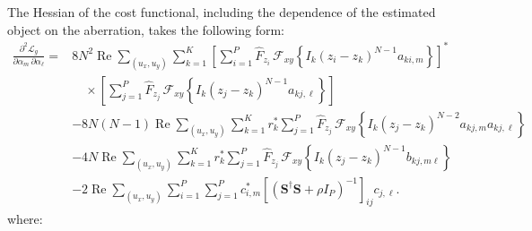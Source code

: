 \documentclass{article}
\begin{document}
The Hessian of the cost functional, including the dependence of the estimated object on the aberration, takes the following form:
\begin{equation}
\begin{aligned}
\frac{\partial^2 \mathcal{L}_g}
{\partial\alpha_m\,\partial\alpha_\ell}
={}&
8N^2\operatorname{Re}
\sum_{(u_x,u_y)}\sum_{k=1}^{K}
\left[
\sum_{i=1}^{P}\widehat F_{z_i}\,
\mathcal F_{xy}
\left\{
I_k(z_i-z_k)^{N-1}a_{ki,m}
\right\}
\right]^*
\\
&\quad\times
\left[
\sum_{j=1}^{P}\widehat F_{z_j}\,
\mathcal F_{xy}
\left\{
I_k(z_j-z_k)^{N-1}a_{kj,\ell}
\right\}
\right]
\\[4pt]
&-
8N(N-1)\operatorname{Re}
\sum_{(u_x,u_y)}\sum_{k=1}^{K}
r_k^*
\sum_{j=1}^{P}\widehat F_{z_j}\,
\mathcal F_{xy}
\left\{
I_k(z_j-z_k)^{N-2}a_{kj,m}a_{kj,\ell}
\right\}
\\[4pt]
&-
4N\operatorname{Re}
\sum_{(u_x,u_y)}\sum_{k=1}^{K}
r_k^*
\sum_{j=1}^{P}\widehat F_{z_j}\,
\mathcal F_{xy}
\left\{
I_k(z_j-z_k)^{N-1}b_{kj,m\ell}
\right\}
\\[4pt]
&-
2\operatorname{Re}
\sum_{(u_x,u_y)}
\sum_{i=1}^{P}\sum_{j=1}^{P}
c_{i,m}^*
\left[
\left(\mathbf S^\dagger\mathbf S+\rho I_P\right)^{-1}
\right]_{ij}
c_{j,\ell}.
\end{aligned}
\end{equation}
where:
\end{document}
